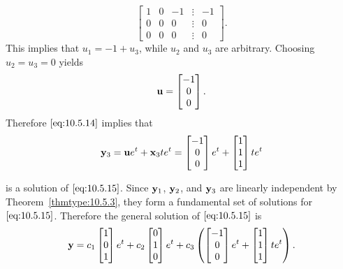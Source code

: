 \documentclass{ximera}
\begin{document}
\begin{example}
\begin{explanation}
$$
\begin{bmatrix} 1 & 0 &- 1 &\vdots& -1\\ 0 & 0 & 0
&\vdots& 0\\ 0 & 0 & 0 &\vdots&0\end{bmatrix}.
$$
This implies that $u_1=-1+u_3$, while  $u_2$  and $u_3$ are arbitrary.
Choosing $u_2=u_3=0$  yields
$$
{\bf u}=\begin{bmatrix}-1\\0\\0\end{bmatrix}.
$$
 Therefore $\eqref{eq:10.5.14}$ implies that
$$
{\bf y}_3={\bf u}e^t+{\bf
x}_3te^t=\begin{bmatrix}-1\\0\\0\end{bmatrix}e^t+\begin{bmatrix}1\\1\\1\end{bmatrix}te^t
$$

is a solution of  $\eqref{eq:10.5.15}$. Since ${\bf y}_1$, ${\bf y}_2$, and
${\bf y}_3$ are linearly independent by Theorem~\ref{thmtype:10.5.3},
they form a fundamental set of solutions for $\eqref{eq:10.5.15}$.
Therefore the general solution of $\eqref{eq:10.5.15}$ is
$$
{\bf y}=c_1\begin{bmatrix}1\\0\\1\end{bmatrix}e^t+c_2\begin{bmatrix}0\\1\\0\end{bmatrix}e^t
+c_3\left(\begin{bmatrix}-1\\0\\0\end{bmatrix}e^t+\begin{bmatrix}1\\1\\1\end{bmatrix}te^t\right).
$$
\end{explanation}
\end{example}
\end{document}
